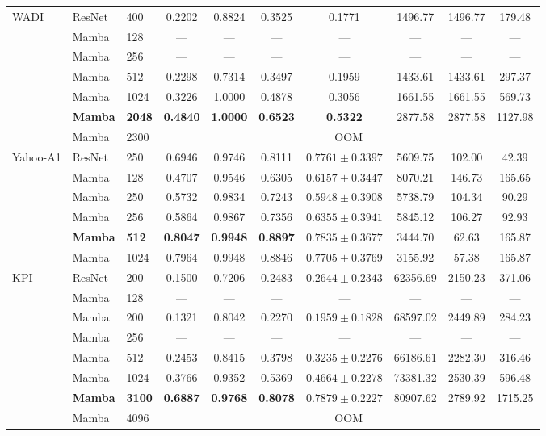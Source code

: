 \documentclass[runningheads]{llncs}
\begin{document}
\begin{table}[H]
{\begin{tabular}{lllccccccc}
\multirow{7}{*}{WADI}
 & ResNet & 400   & 0.2202 & 0.8824 & 0.3525 & 0.1771 & 1496.77 & 1496.77 & 179.48 \\
 & Mamba  & 128   & \textsf{---} & \textsf{---} & \textsf{---} & \textsf{---} & \textsf{---} & \textsf{---} & \textsf{---} \\
 & Mamba  & 256   & \textsf{---} & \textsf{---} & \textsf{---} & \textsf{---} & \textsf{---} & \textsf{---} & \textsf{---} \\
 & Mamba  & 512   & 0.2298 & 0.7314 & 0.3497 & 0.1959 & 1433.61 & 1433.61 & 297.37 \\
 & Mamba  & 1024  & 0.3226 & 1.0000 & 0.4878 & 0.3056 & 1661.55 & 1661.55 & 569.73 \\
 & \textbf{Mamba}  & \textbf{2048}  & \textbf{0.4840} & \textbf{1.0000} & \textbf{0.6523} & \textbf{0.5322} & 2877.58 & 2877.58 & 1127.98 \\
 & Mamba  & 2300  & \multicolumn{7}{c}{\textsf{OOM}} \\
\midrule

\multirow{5}{*}{Yahoo-A1}
 & ResNet & 250   & 0.6946 & 0.9746 & 0.8111 & $0.7761\pm0.3397$ &  5609.75 & 102.00 &  42.39 \\
 & Mamba  & 128   & 0.4707 & 0.9546 & 0.6305 & $0.6157\pm0.3447$ &  8070.21 & 146.73 & 165.65 \\
 & Mamba  & 250   & 0.5732 & 0.9834 & 0.7243 & $0.5948\pm0.3908$ &  5738.79 & 104.34 & 90.29 \\
 & Mamba  & 256   & 0.5864 & 0.9867 & 0.7356 & $0.6355\pm0.3941$ &  5845.12 & 106.27 &  92.93 \\
 & \textbf{Mamba}  & \textbf{512}   & \textbf{0.8047} & \textbf{0.9948} & \textbf{0.8897} & $\mathbf{0.7835\pm0.3677}$ &  3444.70 &  62.63 & 165.87 \\
 & Mamba  & 1024  & 0.7964 & 0.9948 & 0.8846 & $0.7705\pm0.3769$ &  3155.92 &  57.38 & 165.87 \\
\midrule

\multirow{7}{*}{KPI}
 & ResNet & 200   & 0.1500 & 0.7206 & 0.2483 & $0.2644\pm0.2343$ & 62356.69 & 2150.23 &  371.06 \\
 & Mamba  & 128   & \textsf{---} & \textsf{---} & \textsf{---} & \textsf{---} & \textsf{---} & \textsf{---} & \textsf{---} \\
 & Mamba  & 200   & 0.1321 & 0.8042 & 0.2270 & $0.1959\pm0.1828$ & 68597.02 &  2449.89 &  284.23 \\
 & Mamba  & 256   & \textsf{---} & \textsf{---} & \textsf{---} & \textsf{---} & \textsf{---} & \textsf{---} & \textsf{---} \\
 & Mamba  & 512   & 0.2453 & 0.8415 & 0.3798 & $0.3235\pm0.2276$ & 66186.61 & 2282.30 &  316.46 \\
 & Mamba  & 1024  & 0.3766 & 0.9352 & 0.5369 & $0.4664\pm0.2278$ & 73381.32 & 2530.39 &  596.48 \\
 & \textbf{Mamba}  & \textbf{3100}  & \textbf{0.6887} & \textbf{0.9768} & \textbf{0.8078} & $\mathbf{0.7879\pm0.2227}$ & 80907.62 & 2789.92 & 1715.25 \\
 & Mamba  & 4096  & \multicolumn{7}{c}{\textsf{OOM}} \\


\end{tabular}}
\end{table}
\end{document}
